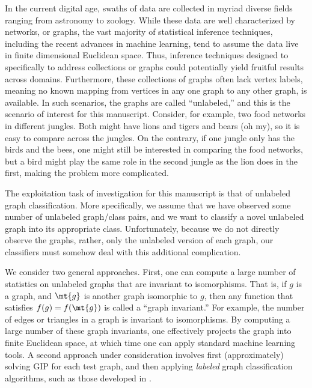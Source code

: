 In the current digital age, swaths of data are collected in myriad diverse fields ranging from astronomy to zoology.  While these data are well characterized by networks, or graphs, the vast majority of statistical inference techniques, including the recent advances in machine learning, tend to assume the data live in finite dimensional Euclidean space.  Thus, inference techniques designed to specifically to address collections or graphs could potentially yield fruitful results across domains.  Furthermore, these collections of graphs often lack vertex labels, meaning no known mapping from vertices in any one graph to any other graph, is available.  In such scenarios, the graphs are called ``unlabeled,'' and this is the scenario of interest for this manuscript.  Consider, for example, two food networks in different jungles.  Both might have lions and tigers and bears (oh my), so it is easy to compare across the jungles.  On the contrary, if one jungle only has the birds and the bees, one might still be interested in comparing the food networks, but a bird might play the same role in the second jungle as the lion does in the first, making the problem more complicated.



The exploitation task of investigation for this manuscript is that of unlabeled graph classification.  More specifically, we assume that we have observed some number of unlabeled graph/class pairs, and we want to classify a novel unlabeled graph into its appropriate class. Unfortunately, because we do not directly observe the graphs, rather, only the unlabeled version of each graph, our classifiers must somehow deal with this additional complication.

We consider two general approaches.  First, one can compute a large number of statistics on unlabeled graphs that are invariant to isomorphisms.  That is, if $g$ is a graph, and $\mt{g}$ is another graph isomorphic to $g$, then any function that satisfies $f(g)=f(\mt{g})$ is called a ``graph invariant.''  For example, the number of edges or triangles in a graph is invariant to isomorphisms.  By computing a large number of these graph invariants, one effectively projects the graph into finite Euclidean space, at which time one can apply standard machine learning tools.  A second approach under consideration involves first (approximately) solving GIP for each test graph, and then applying \emph{labeled} graph classification algorithms, such as those developed in \cite{??}.


